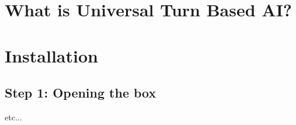 \hypertarget{index_intro_sec}{}\section{What is Universal Turn Based A\+I?}\label{index_intro_sec}
\hypertarget{index_install_sec}{}\section{Installation}\label{index_install_sec}
\hypertarget{index_step1}{}\subsection{Step 1\+: Opening the box}\label{index_step1}
etc... 